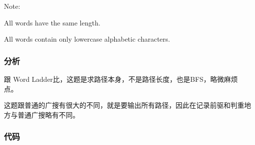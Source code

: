 Note:
\begindot
\item All words have the same length.
\item All words contain only lowercase alphabetic characters.
\myenddot


\subsubsection{分析}
跟 Word Ladder比，这题是求路径本身，不是路径长度，也是BFS，略微麻烦点。

这题跟普通的广搜有很大的不同，就是要输出所有路径，因此在记录前驱和判重地方与普通广搜略有不同。


\subsubsection{代码}

